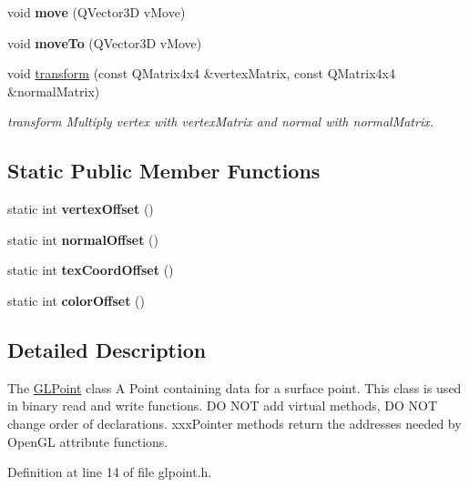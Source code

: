 \begin{DoxyCompactItemize}
void {\bfseries move} (Q\+Vector3D v\+Move)
\item 
\mbox{\label{class_g_l_point_ab85d8d026e488d1c28fdb00c1ab9ad12}} 
void {\bfseries move\+To} (Q\+Vector3D v\+Move)
\item 
void \mbox{\hyperlink{class_g_l_point_a1e65d4eb8478a28ea1ebe6bd98e26837}{transform}} (const Q\+Matrix4x4 \&vertex\+Matrix, const Q\+Matrix4x4 \&normal\+Matrix)
\begin{DoxyCompactList}\small\item\em transform Multiply vertex with vertex\+Matrix and normal with normal\+Matrix. \end{DoxyCompactList}\end{DoxyCompactItemize}
\subsection*{Static Public Member Functions}
\begin{DoxyCompactItemize}
\item 
\mbox{\label{class_g_l_point_ac45fdd4dc914c102ab013eb4d984f994}} 
static int {\bfseries vertex\+Offset} ()
\item 
\mbox{\label{class_g_l_point_a7625e2028fceb48d927236a03bfc3b75}} 
static int {\bfseries normal\+Offset} ()
\item 
\mbox{\label{class_g_l_point_ac94d3bf766f3f81da117997950844b21}} 
static int {\bfseries tex\+Coord\+Offset} ()
\item 
\mbox{\label{class_g_l_point_a91ba1c6cd816cb5e1e11a233ea0d1328}} 
static int {\bfseries color\+Offset} ()
\end{DoxyCompactItemize}


\subsection{Detailed Description}
The \mbox{\hyperlink{class_g_l_point}{G\+L\+Point}} class A Point containing data for a surface point. This class is used in binary read and write functions. DO N\+OT add virtual methods, DO N\+OT change order of declarations. xxx\+Pointer methods return the addresses needed by Open\+GL attribute functions. 

Definition at line 14 of file glpoint.\+h.



